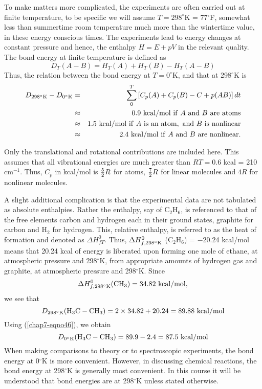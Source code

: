 To make matters more complicated, the experiments are often carried 
out at finite temperature, to be specific we will assume 
$T = 298^{\circ}$K = 77$^{\circ}$F, somewhat less than summertime 
room temperature much more than the wintertime value, in these energy conscious 
times.  The experiments lead to energy changes at constant 
pressure and hence, the enthalpy $H = E + pV$ in the relevant 
quality. The bond energy at finite temperature is defined as
\begin{equation}
D_T(A - B) = H_T(A) + H_T(B) - H_T(A - B)
\label{chap07-eqno45}
\end{equation}
Thus, the relation between the bond energy at $T = 0^{\circ}$K, and that 
at 298$^{\circ}$K is
\begin{eqnarray}
D_{298^{\circ}{\rm K}} - D_{0^{\circ}{\rm K}} & =& \sum^{T}_{0} \left[ C_p (A) + 
C_p (B) - C+p (AB) \right] dt\cr
& \approx & 0.9 ~ {\rm kcal/mol ~ if} ~ A ~ {\rm and} ~ B ~ {\rm are ~ atoms}\cr
& \approx & 1.5 ~ {\rm kcal/mol ~ if} ~ A ~ {\rm is ~ an ~ atom, ~ and} ~ 
B ~ {\rm is ~ nonlinear}\cr
& \approx& 2.4 ~ {\rm kcal/mol ~ if} ~ A ~ {\rm and} ~ B ~ {\rm are ~ 
nonlinear}.
\end{eqnarray}

Only the translational and rotational contributions are included 
here.   This assumes that all vibrational energies are much greater 
than $RT = 0.6$ kcal = 210 cm$^{-1}$.  Thus, $C_p$ in kcal/mol is ${5 
\over 2}R$ for atoms, ${7 \over 2}R$ for linear 
molecules and $4R$ for nonlinear molecules.

A slight additional complication is that the experimental data 
are not tabulated as absolute enthalpies.  Rather the enthalpy, 
say of C$_2$H$_6$, is referenced to that of the free elements carbon 
and hydrogen each in their ground states, graphite for carbon 
and H$_2$ for hydrogen. This, relative enthalpy, is referred to as the 
heat of formation and denoted as $\Delta H^0_{fT}$.  Thus, 
$\Delta H^0_{f,298^{\circ}{\rm K}}$ (C$_2$H$_6$) = $-$20.24 kcal/mol 
means that 20.24 kcal of energy is liberated upon forming one 
mole of ethane, at atmospheric pressure and 298$^{\circ}$K, from appropriate 
amounts of hydrogen gas and graphite, at atmospheric pressure and 
298$^{\circ}$K.  Since 
\begin{equation}
\Delta H^0_{f,298^{\circ}{\rm K}} (\mathrm{CH_3}) = 34.82~\mathrm{kcal/mol}, 
\end{equation}
we see that
\begin{equation}
D_{298^{\circ}{\rm K}} (\mathrm{H_3C-CH_3}) = 2 \times 34.82 + 
20.24 = 89.88 ~ {\rm kcal/mol}
\label{chap07-eqno47}
\end{equation}
Using (\ref{chap7-eqno46}), we obtain
\begin{equation}
D_{0^{\circ}{\rm K}} (\mathrm{H_3C-CH_3}) = 89.9 - 2.4 = 87.5 
~ {\rm kcal/mol}
\label{chap07-eqno48}
\end{equation}
When making comparisons to theory or to spectroscopic 
experiments, the bond energy at 0$^{\circ}$K is more convenient. 
However, in discussing chemical reactions, the bond energy at 
298$^{\circ}$K is generally most convenient. In this course it will be 
understood that bond energies are at 298$^{\circ}$K unless stated otherwise.

